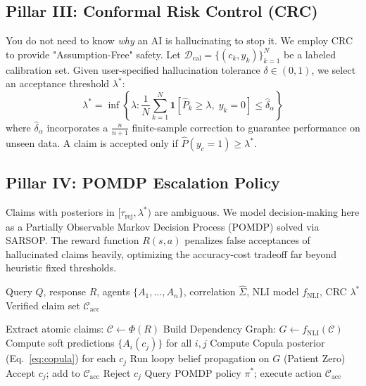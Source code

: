 \documentclass[conference]{IEEEtran}
\begin{document}
\subsection{Pillar III: Conformal Risk Control (CRC)}
\label{sec:crc}
You do not need to know \emph{why} an AI is hallucinating to stop it. We employ CRC to provide "Assumption-Free" safety. Let $\mathcal{D}_\text{cal} = \{(c_k, y_k)\}_{k=1}^{N}$ be a labeled calibration set. Given user-specified hallucination tolerance $\delta \in (0,1)$, we select an acceptance threshold $\lambda^*$:
\begin{equation}
  \lambda^* = \inf\!\left\{ \lambda : \frac{1}{N}\sum_{k=1}^{N} \mathbf{1}\!\left[\hat{P}_k \geq \lambda,\; y_k = 0\right] \leq \hat\delta_\alpha \right\}
  \label{eq:crc}
\end{equation}
where $\hat\delta_\alpha$ incorporates a $\frac{n}{n+1}$ finite-sample correction to guarantee performance on unseen data. A claim is accepted only if $\hat{P}(y_{c} = 1) \geq \lambda^*$.

\subsection{Pillar IV: POMDP Escalation Policy}
Claims with posteriors in $[\tau_\text{rej}, \lambda^*)$ are ambiguous. We model decision-making here as a Partially Observable Markov Decision Process (POMDP) solved via SARSOP. The reward function $R(s, a)$ penalizes false acceptances of hallucinated claims heavily, optimizing the accuracy-cost tradeoff far beyond heuristic fixed thresholds.

\begin{algorithm}
\caption{ACCORD Inference Pipeline}
\label{alg:accord}
\begin{algorithmic}[1]
\REQUIRE Query $Q$, response $R$, agents $\{A_1,\ldots,A_n\}$,
         correlation $\hat{\Sigma}$, NLI model $f_\text{NLI}$, CRC $\lambda^*$
\ENSURE  Verified claim set $\mathcal{C}_\text{acc}$

\STATE Extract atomic claims: $\mathcal{C} \leftarrow \Phi(R)$
\STATE Build Dependency Graph: $G \leftarrow f_\text{NLI}(\mathcal{C})$
\STATE Compute soft predictions $\{A_i(c_j)\}$ for all $i,j$
\STATE Compute Copula posterior (Eq.~\ref{eq:copula}) for each $c_j$
\STATE Run loopy belief propagation on $G$ (Patient Zero)
    \STATE Accept $c_j$; add to $\mathcal{C}_\text{acc}$
    \STATE Reject $c_j$
  \ELSE
    \STATE Query POMDP policy $\pi^*$; execute action
  \ENDIF
\ENDFOR
\RETURN $\mathcal{C}_\text{acc}$
\end{algorithmic}
\end{algorithm}
\end{document}
